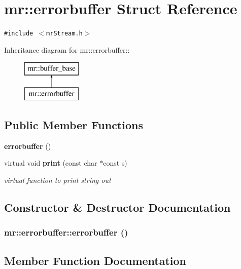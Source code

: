 \section{mr::errorbuffer Struct Reference}
\label{structmr_1_1errorbuffer}
{\tt \#include $<$mr\-Stream.h$>$}

Inheritance diagram for mr::errorbuffer::\begin{figure}[H]
\begin{center}
\leavevmode
\includegraphics[height=2cm]{structmr_1_1errorbuffer}
\end{center}
\end{figure}
\subsection*{Public Member Functions}
\begin{CompactItemize}
\item 
{\bf errorbuffer} ()
\item 
virtual void {\bf print} (const char $\ast$const s)
\begin{CompactList}\small\item\em virtual function to print string out \item\end{CompactList}\end{CompactItemize}


\subsection{Constructor \& Destructor Documentation}
\subsubsection{\setlength{\rightskip}{0pt plus 5cm}mr::errorbuffer::errorbuffer ()\hspace{0.3cm}{\tt  [inline]}}\label{structmr_1_1errorbuffer_a0}




\subsection{Member Function Documentation}
